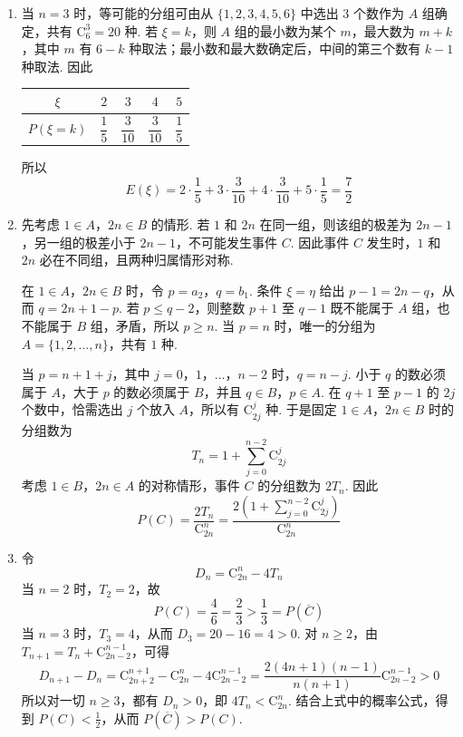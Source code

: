 \begin{solution}
\begin{enumerate}
\item 当 \(n=3\) 时，等可能的分组可由从 \(\{1,2,3,4,5,6\}\) 中选出 \(3\) 个数作为 \(A\) 组确定，共有 \(\mathrm C_6^3=20\) 种. 若 \(\xi=k\)，则 \(A\) 组的最小数为某个 \(m\)，最大数为 \(m+k\)，其中 \(m\) 有 \(6-k\) 种取法；最小数和最大数确定后，中间的第三个数有 \(k-1\) 种取法. 因此
\begin{center}
\begin{tabular}{c|cccc}
\(\xi\) & \(2\) & \(3\) & \(4\) & \(5\) \\
\hline
\(P(\xi=k)\) & \(\dfrac{1}{5}\) & \(\dfrac{3}{10}\) & \(\dfrac{3}{10}\) & \(\dfrac{1}{5}\)
\end{tabular}
\end{center}
所以
\[
E(\xi)=2\cdot\frac{1}{5}+3\cdot\frac{3}{10}+4\cdot\frac{3}{10}+5\cdot\frac{1}{5}=\frac{7}{2}
\]

\item 先考虑 \(1\in A\)，\(2n\in B\) 的情形. 若 \(1\) 和 \(2n\) 在同一组，则该组的极差为 \(2n-1\)，另一组的极差小于 \(2n-1\)，不可能发生事件 \(C\). 因此事件 \(C\) 发生时，\(1\) 和 \(2n\) 必在不同组，且两种归属情形对称.

在 \(1\in A\)，\(2n\in B\) 时，令 \(p=a_2\)，\(q=b_1\). 条件 \(\xi=\eta\) 给出 \(p-1=2n-q\)，从而 \(q=2n+1-p\).
若 \(p\leqslant q-2\)，则整数 \(p+1\) 至 \(q-1\) 既不能属于 \(A\) 组，也不能属于 \(B\) 组，矛盾，所以 \(p\geqslant n\). 当 \(p=n\) 时，唯一的分组为 \(A=\{1,2,\ldots,n\}\)，共有 \(1\) 种.

当 \(p=n+1+j\)，其中 \(j=0\)，\(1\)，\(\ldots\)，\(n-2\) 时，\(q=n-j\). 小于 \(q\) 的数必须属于 \(A\)，大于 \(p\) 的数必须属于 \(B\)，并且 \(q\in B\)，\(p\in A\). 在 \(q+1\) 至 \(p-1\) 的 \(2j\) 个数中，恰需选出 \(j\) 个放入 \(A\)，所以有 \(\mathrm C_{2j}^{j}\) 种. 于是固定 \(1\in A\)，\(2n\in B\) 时的分组数为
\[
T_n=1+\sum_{j=0}^{n-2}\mathrm C_{2j}^{j}
\]
考虑 \(1\in B\)，\(2n\in A\) 的对称情形，事件 \(C\) 的分组数为 \(2T_n\). 因此
\[
P(C)=\frac{2T_n}{\mathrm C_{2n}^{n}}
=\frac{2\left(1+\displaystyle\sum_{j=0}^{n-2}\mathrm C_{2j}^{j}\right)}{\mathrm C_{2n}^{n}}
\]

\item 令
\[
D_n=\mathrm C_{2n}^{n}-4T_n
\]
当 \(n=2\) 时，\(T_2=2\)，故
\[
P(C)=\frac{4}{6}=\frac{2}{3}>\frac{1}{3}=P(\overline C)
\]
当 \(n=3\) 时，\(T_3=4\)，从而 \(D_3=20-16=4>0\). 对 \(n\geqslant2\)，由 \(T_{n+1}=T_n+\mathrm C_{2n-2}^{n-1}\)，可得
\[
D_{n+1}-D_n=\mathrm C_{2n+2}^{n+1}-\mathrm C_{2n}^{n}-4\mathrm C_{2n-2}^{n-1}
=\frac{2(4n+1)(n-1)}{n(n+1)}\mathrm C_{2n-2}^{n-1}>0
\]
所以对一切 \(n\geqslant3\)，都有 \(D_n>0\)，即 \(4T_n<\mathrm C_{2n}^{n}\). 结合上式中的概率公式，得到 \(P(C)<\frac{1}{2}\)，从而 \(P(\overline C)>P(C)\).
\end{enumerate}
\end{solution}
